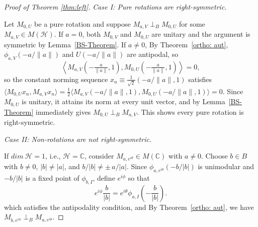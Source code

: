 \documentclass[12pt]{amsart}
\theoremstyle{definition}
\renewcommand{\H}{\mathcal{H}}
\begin{document}
\begin{proof}[Proof of Theorem \ref{thm:left}]
\medskip


\noindent\textit{Case I: Pure rotations are right-symmetric.}


\medskip

\noindent Let $M_{0,U}$ be a pure rotation and suppose 
$M_{a,V} \perp_B M_{0,U}$ for some 
$M_{a,V} \in M(\mathcal{H})$. If $a = 0$, both 
$M_{0,V}$ and $M_{0,U}$ are unitary and the argument 
is symmetric by Lemma~\ref{BS-Theorem}. If $a \neq 0$, By 
Theorem~\ref{ortho: aut}, $\phi_{a,V}\!\left(-a/\|a\|
\right)$ and $U\!\left(-a/\|a\|\right)$ are antipodal, 
so
\[
\left\langle M_{a,V}\!\left(-\tfrac{a}{\|a\|},1\right), 
M_{0,U}\!\left(-\tfrac{a}{\|a\|},1\right)\right\rangle = 0,
\]
so the constant norming sequence 
$x_n \equiv \frac{1}{\sqrt{2}}\!\left(-a/\|a\|, 1\right)$ 
satisfies 
$\langle M_{0,U}x_n, M_{a,V}x_n\rangle 
= \frac{1}{2}\langle M_{a,V}(-a/\|a\|,1), 
M_{0,U}(-a/\|a\|,1)\rangle = 0$.
Since $M_{0,U}$ is unitary, it attains its norm at every unit 
vector, and by Lemma~\ref{BS-Theorem} 
immediately gives $M_{0,U} \perp_B M_{a,V}$. This shows every 
pure rotation is right-symmetric.


\medskip

\noindent\textit{Case II: Non-rotations are not right-symmetric.}



\medskip


\noindent If $dim ~ \H=1$, i.e., $\H = \mathbb{C}$, consider $M_{a,e^{i\theta}} \in M(\mathbb{C})$ with 
$a \neq 0$. Choose $b \in B$ with $b \neq 0$, 
$|b| \neq |a|$, and $b/|b| \neq \pm\, a/|a|$. 
Since $\phi_{a,e^{i\theta}}(-b/|b|)$ is unimodular 
and $-b/|b|$ is a fixed point of $\phi_{b,I}$, 
define $e^{i\phi}$ so that 
\[
e^{i\phi}\frac{b}{|b|} 
= e^{i\theta}\phi_{a,I}\!\left(-\frac{b}{|b|}\right).
\tag{I}
\]
which satisfies the antipodality condition, and By Theorem~\ref{ortho: aut}, we have 
$M_{b,e^{i\phi}} \perp_B M_{a,e^{i\theta}}$.

\medskip


\end{proof}
\end{document}
